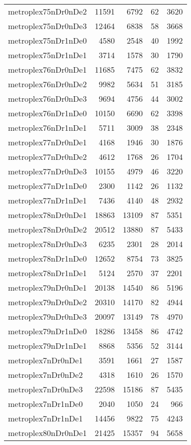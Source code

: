\begin{tabular}{lrrrr}
metroplex75nDr0nDe2 & 11591 & 6792 & 62 & 3620 \\
metroplex75nDr0nDe3 & 12464 & 6838 & 58 & 3668 \\
metroplex75nDr1nDe0 & 4580 & 2548 & 40 & 1992 \\
metroplex75nDr1nDe1 & 3714 & 1578 & 30 & 1790 \\
metroplex76nDr0nDe1 & 11685 & 7475 & 62 & 3832 \\
metroplex76nDr0nDe2 & 9982 & 5634 & 51 & 3185 \\
metroplex76nDr0nDe3 & 9694 & 4756 & 44 & 3002 \\
metroplex76nDr1nDe0 & 10150 & 6690 & 62 & 3398 \\
metroplex76nDr1nDe1 & 5711 & 3009 & 38 & 2348 \\
metroplex77nDr0nDe1 & 4168 & 1946 & 30 & 1876 \\
metroplex77nDr0nDe2 & 4612 & 1768 & 26 & 1704 \\
metroplex77nDr0nDe3 & 10155 & 4979 & 46 & 3220 \\
metroplex77nDr1nDe0 & 2300 & 1142 & 26 & 1132 \\
metroplex77nDr1nDe1 & 7436 & 4140 & 48 & 2932 \\
metroplex78nDr0nDe1 & 18863 & 13109 & 87 & 5351 \\
metroplex78nDr0nDe2 & 20512 & 13880 & 87 & 5433 \\
metroplex78nDr0nDe3 & 6235 & 2301 & 28 & 2014 \\
metroplex78nDr1nDe0 & 12652 & 8754 & 73 & 3825 \\
metroplex78nDr1nDe1 & 5124 & 2570 & 37 & 2201 \\
metroplex79nDr0nDe1 & 20138 & 14540 & 86 & 5196 \\
metroplex79nDr0nDe2 & 20310 & 14170 & 82 & 4944 \\
metroplex79nDr0nDe3 & 20097 & 13149 & 78 & 4970 \\
metroplex79nDr1nDe0 & 18286 & 13458 & 86 & 4742 \\
metroplex79nDr1nDe1 & 8868 & 5356 & 52 & 3144 \\
metroplex7nDr0nDe1 & 3591 & 1661 & 27 & 1587 \\
metroplex7nDr0nDe2 & 4318 & 1610 & 26 & 1570 \\
metroplex7nDr0nDe3 & 22598 & 15186 & 87 & 5435 \\
metroplex7nDr1nDe0 & 2040 & 1050 & 24 & 966 \\
metroplex7nDr1nDe1 & 14456 & 9822 & 75 & 4243 \\
metroplex80nDr0nDe1 & 21425 & 15357 & 94 & 5658 \\

\end{tabular}
